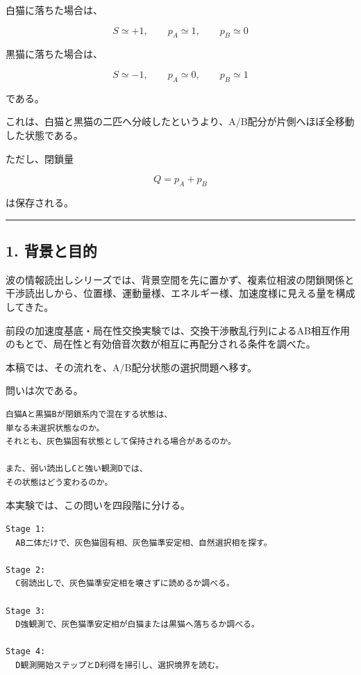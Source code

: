 \documentclass{article}
\begin{document}
白猫に落ちた場合は、

\[
S \simeq +1,\qquad p_A\simeq 1,\qquad p_B\simeq 0
\]

黒猫に落ちた場合は、

\[
S \simeq -1,\qquad p_A\simeq 0,\qquad p_B\simeq 1
\]

である。

これは、白猫と黒猫の二匹へ分岐したというより、A/B配分が片側へほぼ全移動した状態である。

ただし、閉鎖量

\[
Q=p_A+p_B
\]

は保存される。

\begin{center}\rule{0.5\linewidth}{0.5pt}\end{center}

\subsection{1. 背景と目的}\label{ux80ccux666fux3068ux76eeux7684}

波の情報読出しシリーズでは、背景空間を先に置かず、複素位相波の閉鎖関係と干渉読出しから、位置様、運動量様、エネルギー様、加速度様に見える量を構成してきた。

前段の加速度基底・局在性交換実験では、交換干渉散乱行列によるAB相互作用のもとで、局在性と有効倍音次数が相互に再配分される条件を調べた。

本稿では、その流れを、A/B配分状態の選択問題へ移す。

問いは次である。

\begin{verbatim}
白猫Aと黒猫Bが閉鎖系内で混在する状態は、
単なる未選択状態なのか。
それとも、灰色猫固有状態として保持される場合があるのか。

また、弱い読出しCと強い観測Dでは、
その状態はどう変わるのか。
\end{verbatim}

本実験では、この問いを四段階に分ける。

\begin{verbatim}
Stage 1:
  AB二体だけで、灰色猫固有相、灰色猫準安定相、自然選択相を探す。

Stage 2:
  C弱読出しで、灰色猫準安定相を壊さずに読めるか調べる。

Stage 3:
  D強観測で、灰色猫準安定相が白猫または黒猫へ落ちるか調べる。

Stage 4:
  D観測開始ステップとD利得を掃引し、選択境界を読む。
\end{verbatim}
\end{document}
